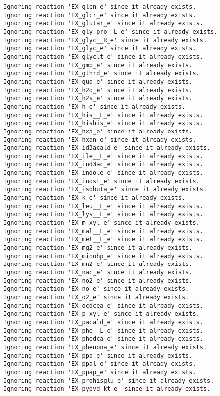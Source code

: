 \documentclass[
  letterpaper,
  DIV=11,
  numbers=noendperiod]{scrartcl}
\begin{document}
\begin{verbatim}
Ignoring reaction 'EX_glcn_e' since it already exists.
Ignoring reaction 'EX_glcr_e' since it already exists.
Ignoring reaction 'EX_glutar_e' since it already exists.
Ignoring reaction 'EX_gly_pro__L_e' since it already exists.
Ignoring reaction 'EX_glyc__R_e' since it already exists.
Ignoring reaction 'EX_glyc_e' since it already exists.
Ignoring reaction 'EX_glyclt_e' since it already exists.
Ignoring reaction 'EX_gmp_e' since it already exists.
Ignoring reaction 'EX_gthrd_e' since it already exists.
Ignoring reaction 'EX_gua_e' since it already exists.
Ignoring reaction 'EX_h2o_e' since it already exists.
Ignoring reaction 'EX_h2s_e' since it already exists.
Ignoring reaction 'EX_h_e' since it already exists.
Ignoring reaction 'EX_his__L_e' since it already exists.
Ignoring reaction 'EX_hishis_e' since it already exists.
Ignoring reaction 'EX_hxa_e' since it already exists.
Ignoring reaction 'EX_hxan_e' since it already exists.
Ignoring reaction 'EX_id3acald_e' since it already exists.
Ignoring reaction 'EX_ile__L_e' since it already exists.
Ignoring reaction 'EX_ind3ac_e' since it already exists.
Ignoring reaction 'EX_indole_e' since it already exists.
Ignoring reaction 'EX_inost_e' since it already exists.
Ignoring reaction 'EX_isobuta_e' since it already exists.
Ignoring reaction 'EX_k_e' since it already exists.
Ignoring reaction 'EX_leu__L_e' since it already exists.
Ignoring reaction 'EX_lys__L_e' since it already exists.
Ignoring reaction 'EX_m_xyl_e' since it already exists.
Ignoring reaction 'EX_mal__L_e' since it already exists.
Ignoring reaction 'EX_met__L_e' since it already exists.
Ignoring reaction 'EX_mg2_e' since it already exists.
Ignoring reaction 'EX_minohp_e' since it already exists.
Ignoring reaction 'EX_mn2_e' since it already exists.
Ignoring reaction 'EX_nac_e' since it already exists.
Ignoring reaction 'EX_no2_e' since it already exists.
Ignoring reaction 'EX_no_e' since it already exists.
Ignoring reaction 'EX_o2_e' since it already exists.
Ignoring reaction 'EX_ocdcea_e' since it already exists.
Ignoring reaction 'EX_p_xyl_e' since it already exists.
Ignoring reaction 'EX_pacald_e' since it already exists.
Ignoring reaction 'EX_phe__L_e' since it already exists.
Ignoring reaction 'EX_phedca_e' since it already exists.
Ignoring reaction 'EX_phenona_e' since it already exists.
Ignoring reaction 'EX_ppa_e' since it already exists.
Ignoring reaction 'EX_ppal_e' since it already exists.
Ignoring reaction 'EX_ppap_e' since it already exists.
Ignoring reaction 'EX_prohisglu_e' since it already exists.
Ignoring reaction 'EX_pyovd_kt_e' since it already exists.

\end{verbatim}
\end{document}
